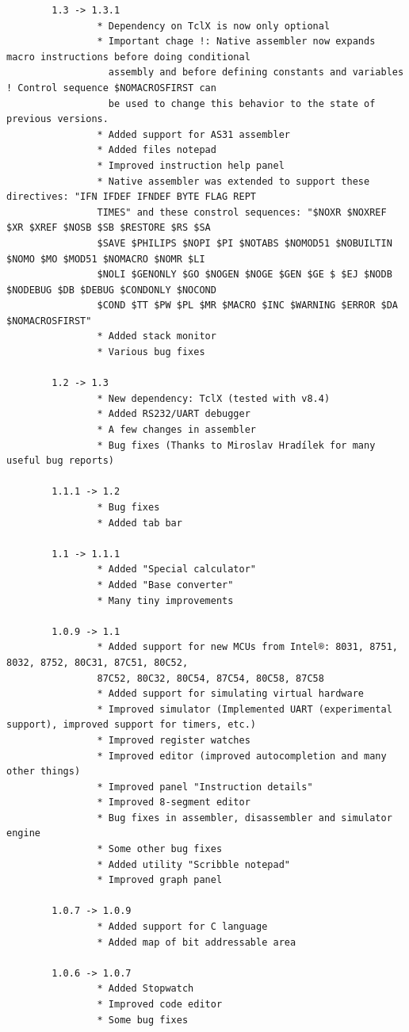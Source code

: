 \documentclass[a4paper,twoside,12pt]{book}
\begin{document}
{\begin{verbatim}
		1.3 -> 1.3.1
		        * Dependency on TclX is now only optional
		        * Important chage !: Native assembler now expands macro instructions before doing conditional
		          assembly and before defining constants and variables ! Control sequence $NOMACROSFIRST can
		          be used to change this behavior to the state of previous versions.
		        * Added support for AS31 assembler
		        * Added files notepad
		        * Improved instruction help panel
		        * Native assembler was extended to support these directives: "IFN IFDEF IFNDEF BYTE FLAG REPT
		        TIMES" and these constrol sequences: "$NOXR $NOXREF $XR $XREF $NOSB $SB $RESTORE $RS $SA
		        $SAVE $PHILIPS $NOPI $PI $NOTABS $NOMOD51 $NOBUILTIN $NOMO $MO $MOD51 $NOMACRO $NOMR $LI
		        $NOLI $GENONLY $GO $NOGEN $NOGE $GEN $GE $ $EJ $NODB $NODEBUG $DB $DEBUG $CONDONLY $NOCOND
		        $COND $TT $PW $PL $MR $MACRO $INC $WARNING $ERROR $DA $NOMACROSFIRST"
		        * Added stack monitor
		        * Various bug fixes

		1.2 -> 1.3
		        * New dependency: TclX (tested with v8.4)
		        * Added RS232/UART debugger
		        * A few changes in assembler
		        * Bug fixes (Thanks to Miroslav Hradílek for many useful bug reports)

		1.1.1 -> 1.2
		        * Bug fixes
		        * Added tab bar

		1.1 -> 1.1.1
		        * Added "Special calculator"
		        * Added "Base converter"
		        * Many tiny improvements

		1.0.9 -> 1.1
		        * Added support for new MCUs from Intel®: 8031, 8751, 8032, 8752, 80C31, 87C51, 80C52,
		        87C52, 80C32, 80C54, 87C54, 80C58, 87C58
		        * Added support for simulating virtual hardware
		        * Improved simulator (Implemented UART (experimental support), improved support for timers, etc.)
		        * Improved register watches
		        * Improved editor (improved autocompletion and many other things)
		        * Improved panel "Instruction details"
		        * Improved 8-segment editor
		        * Bug fixes in assembler, disassembler and simulator engine
		        * Some other bug fixes
		        * Added utility "Scribble notepad"
		        * Improved graph panel

		1.0.7 -> 1.0.9
		        * Added support for C language
		        * Added map of bit addressable area

		1.0.6 -> 1.0.7
		        * Added Stopwatch
		        * Improved code editor
		        * Some bug fixes


\end{verbatim}}
\end{document}
